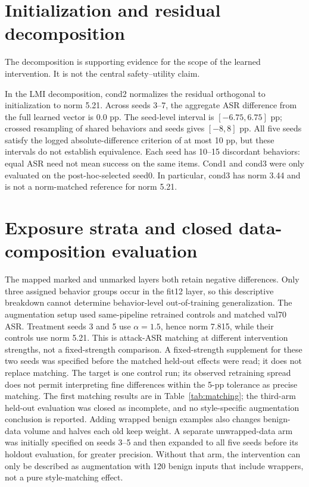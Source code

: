 \section{Initialization and residual decomposition}
\label{app:initialization}
The decomposition is supporting evidence for the scope of the learned intervention. It is not the central safety--utility claim.


In the LMI decomposition, cond2 normalizes the residual orthogonal to initialization to norm 5.21. Across seeds 3--7, the aggregate ASR difference from the full learned vector is 0.0 pp. The seed-level interval is $[-6.75,6.75]$ pp; crossed resampling of shared behaviors and seeds gives $[-8,8]$ pp. All five seeds satisfy the logged absolute-difference criterion of at most 10 pp, but these intervals do not establish equivalence. Each seed has 10--15 discordant behaviors: equal ASR need not mean success on the same items. Cond1 and cond3 were only evaluated on the post-hoc-selected seed0. In particular, cond3 has norm 3.44 and is not a norm-matched reference for norm 5.21.


\section{Exposure strata and closed data-composition evaluation}


The mapped marked and unmarked layers both retain negative differences. Only three assigned behavior groups occur in the fit12 layer, so this descriptive breakdown cannot determine behavior-level out-of-training generalization.
The augmentation setup used same-pipeline retrained controls and matched val70 ASR. Treatment seeds 3 and 5 use $\alpha=1.5$, hence norm 7.815, while their controls use norm 5.21. This is attack-ASR matching at different intervention strengths, not a fixed-strength comparison. A fixed-strength supplement for these two seeds was specified before the matched held-out effects were read; it does not replace matching. The target is one control run; its observed retraining spread does not permit interpreting fine differences within the 5-pp tolerance as precise matching. The first matching results are in Table~\ref{tab:matching}; the third-arm held-out evaluation was closed as incomplete, and no style-specific augmentation conclusion is reported. Adding wrapped benign examples also changes benign-data volume and halves each old keep weight. A separate unwrapped-data arm was initially specified on seeds 3--5 and then expanded to all five seeds before its holdout evaluation, for greater precision. Without that arm, the intervention can only be described as augmentation with 120 benign inputs that include wrappers, not a pure style-matching effect.


